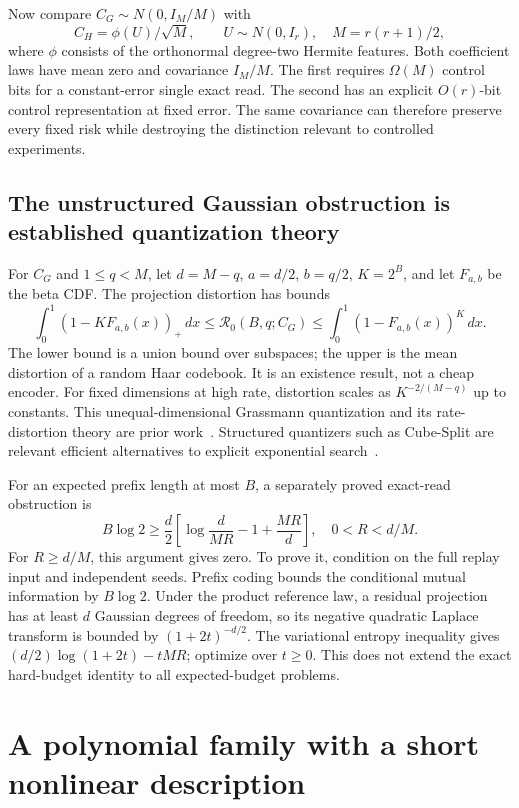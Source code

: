 \documentclass[11pt]{article}
\begin{document}
Now compare $C_G\sim N(0,I_M/M)$ with
\[
C_H=\phi(U)/\sqrt M,\qquad U\sim N(0,I_r),\quad M=r(r+1)/2,
\]
where $\phi$ consists of the orthonormal degree-two Hermite features. Both coefficient laws have mean zero and covariance $I_M/M$. The first requires $\Omega(M)$ control bits for a constant-error single exact read. The second has an explicit $O(r)$-bit control representation at fixed error. The same covariance can therefore preserve every fixed risk while destroying the distinction relevant to controlled experiments.

\subsection{The unstructured Gaussian obstruction is established quantization theory}

For $C_G$ and $1\le q<M$, let $d=M-q$, $a=d/2$, $b=q/2$, $K=2^B$, and let $F_{a,b}$ be the beta CDF. The projection distortion has bounds
\begin{equation}
\int_0^1(1-KF_{a,b}(x))_+\,dx
\le \mathcal R_0(B,q;C_G)
\le\int_0^1(1-F_{a,b}(x))^K\,dx.
\end{equation}
The lower bound is a union bound over subspaces; the upper is the mean distortion of a random Haar codebook. It is an existence result, not a cheap encoder. For fixed dimensions at high rate, distortion scales as $K^{-2/(M-q)}$ up to constants. This unequal-dimensional Grassmann quantization and its rate-distortion theory are prior work~\cite{dai}. Structured quantizers such as Cube-Split are relevant efficient alternatives to explicit exponential search~\cite{cube}.

For an expected prefix length at most $B$, a separately proved exact-read obstruction is
\begin{equation}
B\log2\ge\frac d2\left[\log\frac{d}{MR}-1+\frac{MR}{d}\right],
\quad 0<R<d/M.
\label{eq:prefix}
\end{equation}
For $R\ge d/M$, this argument gives zero. To prove it, condition on the full replay input and independent seeds. Prefix coding bounds the conditional mutual information by $B\log2$. Under the product reference law, a residual projection has at least $d$ Gaussian degrees of freedom, so its negative quadratic Laplace transform is bounded by $(1+2t)^{-d/2}$. The variational entropy inequality gives $(d/2)\log(1+2t)-tMR$; optimize over $t\ge0$. This does not extend the exact hard-budget identity to all expected-budget problems.

\section{A polynomial family with a short nonlinear description}
\end{document}
